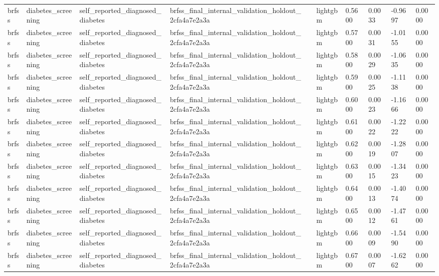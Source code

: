 \begin{tabular}{llllllllll}
brfss & diabetes\_screening & self\_reported\_diagnosed\_diabetes & brfss\_final\_internal\_validation\_holdout\_2cfa4a7e2a3a &  & lightgbm & 0.5600 & 0.0033 & -0.9697 & 0.0000 \\
brfss & diabetes\_screening & self\_reported\_diagnosed\_diabetes & brfss\_final\_internal\_validation\_holdout\_2cfa4a7e2a3a &  & lightgbm & 0.5700 & 0.0031 & -1.0155 & 0.0000 \\
brfss & diabetes\_screening & self\_reported\_diagnosed\_diabetes & brfss\_final\_internal\_validation\_holdout\_2cfa4a7e2a3a &  & lightgbm & 0.5800 & 0.0029 & -1.0635 & 0.0000 \\
brfss & diabetes\_screening & self\_reported\_diagnosed\_diabetes & brfss\_final\_internal\_validation\_holdout\_2cfa4a7e2a3a &  & lightgbm & 0.5900 & 0.0025 & -1.1138 & 0.0000 \\
brfss & diabetes\_screening & self\_reported\_diagnosed\_diabetes & brfss\_final\_internal\_validation\_holdout\_2cfa4a7e2a3a &  & lightgbm & 0.6000 & 0.0023 & -1.1666 & 0.0000 \\
brfss & diabetes\_screening & self\_reported\_diagnosed\_diabetes & brfss\_final\_internal\_validation\_holdout\_2cfa4a7e2a3a &  & lightgbm & 0.6100 & 0.0022 & -1.2222 & 0.0000 \\
brfss & diabetes\_screening & self\_reported\_diagnosed\_diabetes & brfss\_final\_internal\_validation\_holdout\_2cfa4a7e2a3a &  & lightgbm & 0.6200 & 0.0019 & -1.2807 & 0.0000 \\
brfss & diabetes\_screening & self\_reported\_diagnosed\_diabetes & brfss\_final\_internal\_validation\_holdout\_2cfa4a7e2a3a &  & lightgbm & 0.6300 & 0.0015 & -1.3423 & 0.0000 \\
brfss & diabetes\_screening & self\_reported\_diagnosed\_diabetes & brfss\_final\_internal\_validation\_holdout\_2cfa4a7e2a3a &  & lightgbm & 0.6400 & 0.0013 & -1.4074 & 0.0000 \\
brfss & diabetes\_screening & self\_reported\_diagnosed\_diabetes & brfss\_final\_internal\_validation\_holdout\_2cfa4a7e2a3a &  & lightgbm & 0.6500 & 0.0012 & -1.4761 & 0.0000 \\
brfss & diabetes\_screening & self\_reported\_diagnosed\_diabetes & brfss\_final\_internal\_validation\_holdout\_2cfa4a7e2a3a &  & lightgbm & 0.6600 & 0.0009 & -1.5490 & 0.0000 \\
brfss & diabetes\_screening & self\_reported\_diagnosed\_diabetes & brfss\_final\_internal\_validation\_holdout\_2cfa4a7e2a3a &  & lightgbm & 0.6700 & 0.0007 & -1.6262 & 0.0000 \\

\end{tabular}
